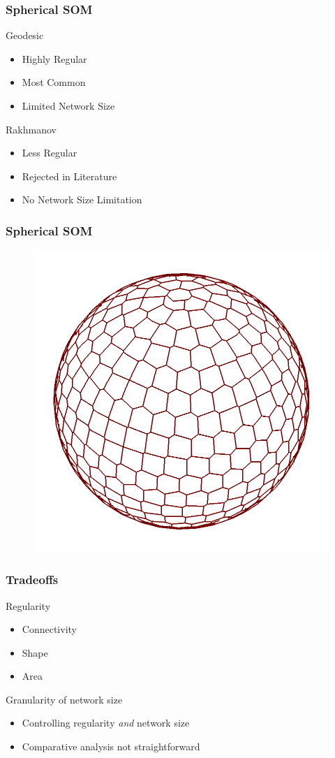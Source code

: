 \documentclass[nototal,handout]{beamer}
\begin{document}
\begin{frame}
	\frametitle{Spherical SOM}
 
\begin{block}{Geodesic}
 \begin{itemize}
 \item  Highly Regular
 \item  Most Common
 \item  Limited Network Size
 \end{itemize}
 \end{block} 
\begin{block}{Rakhmanov}
 \begin{itemize}
 \item  Less Regular
 \item  Rejected in Literature
 \item  No Network Size Limitation
 \end{itemize}
 \end{block} \end{frame} 

\begin{frame}
	\frametitle{Spherical SOM}
  \begin{center}
  \begin{figure}
  \includegraphics[width=0.60\linewidth]{642.png}
  \end{figure}
  \end{center}
 \end{frame} 

\begin{frame}
	\frametitle{Tradeoffs}
 
\begin{block}{Regularity}
 \begin{itemize}
 \item  Connectivity
 \item  Shape
 \item  Area
 \end{itemize}
 \end{block} 
\begin{block}{Granularity of network size}
 \begin{itemize}
 \item  Controlling regularity \emph{and} network size
 \item  Comparative analysis not straightforward
 \end{itemize}
 \end{block} \end{frame} 
\end{document}
